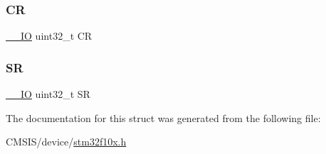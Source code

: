 \mbox{\label{struct_w_w_d_g___type_def_ab40c89c59391aaa9d9a8ec011dd0907a}} 
\subsubsection{\texorpdfstring{CR}{CR}}
{\footnotesize\ttfamily \mbox{\hyperlink{core__sc300_8h_aec43007d9998a0a0e01faede4133d6be}{\+\_\+\+\_\+\+IO}} uint32\+\_\+t CR}

\mbox{\label{struct_w_w_d_g___type_def_af6aca2bbd40c0fb6df7c3aebe224a360}} 
\subsubsection{\texorpdfstring{SR}{SR}}
{\footnotesize\ttfamily \mbox{\hyperlink{core__sc300_8h_aec43007d9998a0a0e01faede4133d6be}{\+\_\+\+\_\+\+IO}} uint32\+\_\+t SR}



The documentation for this struct was generated from the following file\+:\begin{DoxyCompactItemize}
\item 
C\+M\+S\+I\+S/device/\mbox{\hyperlink{stm32f10x_8h}{stm32f10x.\+h}}\end{DoxyCompactItemize}
